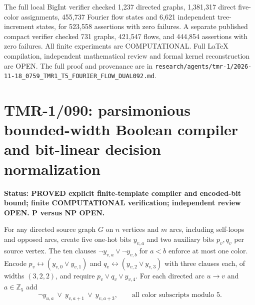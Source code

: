 \documentclass[11pt]{article}
\begin{document}
The full local BigInt verifier checked 1,237 directed graphs, 1,381,317
direct five-color assignments, 455,737 Fourier flow states and 6,621
independent tree-increment states, for 523,558 assertions with zero
failures. A separate published compact verifier checked 731 graphs,
421,547 flows, and 444,854 assertions with zero failures. All finite
experiments are COMPUTATIONAL. Full LaTeX compilation, independent
mathematical review and formal kernel reconstruction are OPEN.
The full proof and provenance are in
\texttt{research/agents/tmr-1/2026-11-18\_0759\_TMR1\_T5\_FOURIER\_FLOW\_DUAL092.md}.
\par


\section{TMR-1/090: parsimonious bounded-width Boolean compiler and bit-linear decision normalization}
\noindent\textbf{Status: PROVED explicit finite-template compiler and encoded-bit bound;
finite COMPUTATIONAL verification; independent review OPEN. P versus NP OPEN.}

For any directed source graph $G$ on $n$ vertices and $m$ arcs, including
self-loops and opposed arcs, create five one-hot bits $y_{v,a}$
and two auxiliary bits $p_v,q_v$ per source vertex.
The ten clauses $\neg y_{v,a}\vee\neg y_{v,b}$ for $a<b$
enforce at most one color.
Encode $p_v\leftrightarrow(y_{v,0}\vee y_{v,1})$ and
$q_v\leftrightarrow(y_{v,2}\vee y_{v,3})$ with three
clauses each, of widths $(3,2,2)$, and require
$p_v\vee q_v\vee y_{v,4}$.
For each directed arc $u\to v$ and $a\in\mathbb Z_5$ add
\[
\neg y_{u,a}\ \vee\ y_{v,a+1}\ \vee\ y_{v,a+3},
\qquad \text{all color subscripts modulo }5.
\]
\end{document}
